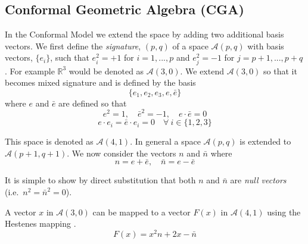 
\subsection{Conformal Geometric Algebra (CGA)}

In the Conformal Model \cite{hestenes2} we extend the space by adding two 
additional basis
vectors. We first define the \emph{signature}, $(p,q)$ of a space
$\mathcal{A}(p,q)$ with basis vectors, $\{e_i\}$, such
that $e_i^2 = +1$ for $i = 1, ..., p$ and $e_j^2 = -1$ for $j = p+1, ..., p+q$.
For example $\mathbb{R}^3$ would
be denoted as $\mathcal{A}(3,0)$.
We extend $\mathcal{A}(3,0)$ so that it becomes mixed signature and is defined by the basis
\begin{displaymath}
\{ e_1, e_2, e_3, e, \bar{e} \}
\end{displaymath}
where $e$ and $\bar{e}$ are defined so that
\begin{displaymath}
e^2 = 1,\quad \bar{e}^2 = -1, \quad e\cdot \bar{e} = 0
\end{displaymath}
\begin{displaymath}
e \cdot e_i = \bar{e} \cdot e_i = 0 \quad \forall \  i \in \{ 1,2,3 \}
\end{displaymath}

This space is denoted as $\mathcal{A}(4,1)$. In general a 
space $\mathcal{A}(p,q)$ is extended to $\mathcal{A}(p+1,q+1)$.
We now consider the vectors $n$ and $\bar{n}$ where
\begin{displaymath}
n = e + \bar{e}, \quad \bar{n} = e - \bar{e}
\end{displaymath}

It is simple to show by direct substitution that both $n$ and $\bar{n}$ are
\emph{null vectors} (i.e.\ $n^2 = \bar{n}^2 = 0$).

A vector $x$ in $\mathcal{A}(3,0)$ can be mapped to a vector $F(x)$ in $\mathcal{A}(4,1)$
using the Hestenes mapping \cite{hestenes}.
\begin{displaymath}
F(x) = x^2n + 2x - \bar{n}
\end{displaymath}


